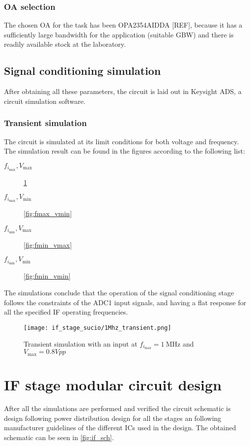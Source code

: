 \subsubsection{OA selection}
The chosen OA for the task has been OPA2354AIDDA [REF], because it has a sufficiently large bandwidth for the application (suitable GBW) and there is readily available stock at the laboratory.

\subsection{Signal conditioning simulation}

After obtaining all these parameters, the circuit is laid out in Keysight ADS, a circuit simulation software.

\subsubsection{Transient simulation}
The circuit is simulated at its limit conditions for both voltage and frequency. The simulation result can be found in the figures according to the following list:
\begin{description}
	\item [$f_{i_{\max}}, V_{\max}$] \cref{fig:fmax_vmax}
	\item [$f_{i_{\max}}, V_{\min}$] \cref{fig:fmax_vmin}
	\item [$f_{i_{\min}}, V_{\max}$] \cref{fig:fmin_vmax}
	\item [$f_{i_{\min}}, V_{\min}$] \cref{fig:fmin_vmin}
\end{description}


The simulations conclude that the operation of the signal conditioning stage follows the constraints of the ADC1 input signals, and having a flat response for all the specified IF operating frequencies.

\begin{figure}[h]
	\centering
	\texttt{[image: if\_stage\_sucio/1Mhz\_transient.png]}
	\caption{Transient simulation with an input at $f_{i_{\max}} = \SI{1}{\mega\hertz}$ and $V_{\max} = 0.8 Vpp$}
	\label{fig:fmax_vmax}
\end{figure}

\section{IF stage modular circuit design}
After all the simulations are performed and verified the circuit schematic is design following power distribution design for all the stages an following manufacturer guidelines of the different ICs used in the design. The obtained schematic can be seen in \cref{fig:if_sch}.

